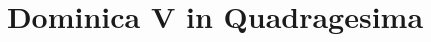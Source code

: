 \documentclass[17pt]{extarticle}
\begin{document}
\title{Dominica V in Quadragesima}
\makereadingtitle

\end{document}
